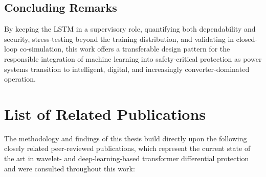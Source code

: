 \documentclass[12pt,a4paper,oneside]{report}
\begin{document}
\section{Concluding Remarks}
By keeping the LSTM in a supervisory role, quantifying both dependability and security, stress-testing beyond the training distribution, and validating in closed-loop co-simulation, this work offers a transferable design pattern for the responsible integration of machine learning into safety-critical protection as power systems transition to intelligent, digital, and increasingly converter-dominated operation.

\chapter*{List of Related Publications}
The methodology and findings of this thesis build directly upon the following closely related peer-reviewed publications, which represent the current state of the art in wavelet- and deep-learning-based transformer differential protection and were consulted throughout this work:
\end{document}
